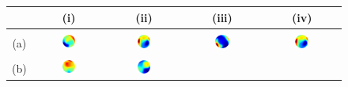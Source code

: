 \documentclass[authoryear,preprint,12pt]{elsarticle}
\begin{document}
\begin{figure}[!htbp]
  \begin{center}
    \begin{tabular}{c|cccc}
      & (i) & (ii) & (iii) & (iv)\\
      \hline
      \\
      (a) & \includegraphics[width=0.2\textwidth]{73100.ps} &
      \includegraphics[width=0.2\textwidth]{73101.ps} &
      \includegraphics[width=0.2\textwidth]{73102.ps} & 
      \includegraphics[width=0.2\textwidth]{73103.ps}\\
      \\
      (b) & \includegraphics[width=0.2\textwidth]{73104.ps} &
      \includegraphics[width=0.2\textwidth]{73105.ps} &

\end{tabular}
\end{center}
\end{figure}
\end{document}
